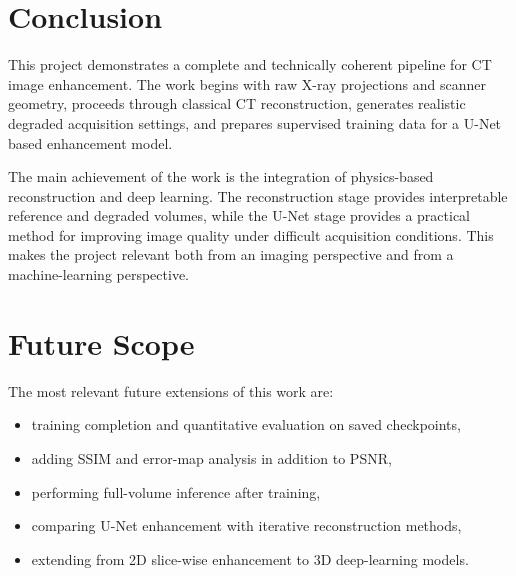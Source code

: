 \documentclass[12pt,a4paper]{article}
\begin{document}
\section{Conclusion}
This project demonstrates a complete and technically coherent pipeline for CT image enhancement. The work begins with raw X-ray projections and scanner geometry, proceeds through classical CT reconstruction, generates realistic degraded acquisition settings, and prepares supervised training data for a U-Net based enhancement model.

The main achievement of the work is the integration of physics-based reconstruction and deep learning. The reconstruction stage provides interpretable reference and degraded volumes, while the U-Net stage provides a practical method for improving image quality under difficult acquisition conditions. This makes the project relevant both from an imaging perspective and from a machine-learning perspective.

\section{Future Scope}
The most relevant future extensions of this work are:
\begin{itemize}[leftmargin=*]
\item training completion and quantitative evaluation on saved checkpoints,
\item adding SSIM and error-map analysis in addition to PSNR,
\item performing full-volume inference after training,
\item comparing U-Net enhancement with iterative reconstruction methods,
\item extending from 2D slice-wise enhancement to 3D deep-learning models.
\end{itemize}
\end{document}

